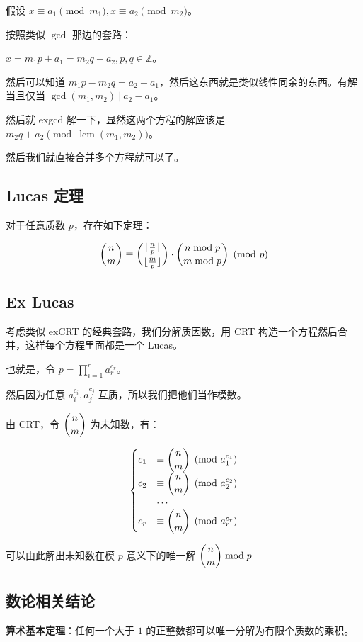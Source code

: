 \documentclass[titlepage, a4paper]{article}
\begin{document}
\begin{multicols}{2}
\begin{spacing}{0.6}
			 		假设 $x \equiv a_1 \pmod{m_1}, x \equiv a_2 \pmod{m_2}$。
			 		
			 		按照类似 $\gcd$ 那边的套路：
			 		
			 		$x = m_1p + a_1 = m_2q + a_2, p, q \in \mathbb{Z}$。
			 		
			 		然后可以知道 $m_1p - m_2q = a_2 - a_1$，然后这东西就是类似线性同余的东西。有解当且仅当 $\gcd(m_1, m_2)\ |\ a_2 - a_1$。
			 		
			 		然后就 exgcd 解一下，显然这两个方程的解应该是 $m_2q + a_2 \pmod{\operatorname{lcm}(m_1, m_2)}$。
			 		
			 		然后我们就直接合并多个方程就可以了。
			 	\subsection{Lucas 定理}
			 		对于任意质数 $p$，存在如下定理：
			 		
			 		$$
			 		\dbinom{n}{m} \equiv \dbinom{\lfloor\frac{n}{p}\rfloor}{\lfloor\frac{m}{p}\rfloor} \cdot \dbinom{n \bmod p}{m \bmod p} \pmod p
			 		$$
			 		
			 	\subsection{Ex Lucas}
			 		
			 		考虑类似 exCRT 的经典套路，我们分解质因数，用 CRT 构造一个方程然后合并，这样每个方程里面都是一个 Lucas。
			 		
			 		也就是，令 $p = \prod\limits_{i = 1}^ra_{r}^{c_r}$。
			 		
			 		然后因为任意 $a_{i}^{c_i}, a_{j}^{c_j}$ 互质，所以我们把他们当作模数。
			 		
			 		由 CRT，令 $\dbinom{n}{m}$ 为未知数，有：
			 		
			 		$$
			 		\begin{cases}
			 			c_1 &\equiv \dbinom{n}{m} \pmod {a_{1}^{c_1}} \\
			 			c_2 &\equiv \dbinom{n}{m} \pmod {a_{2}^{c_2}} \\
			 			&\cdots\\
			 			c_r &\equiv \dbinom{n}{m} \pmod {a_{r}^{c_r}}
			 		\end{cases}
			 		$$
			 		
			 		可以由此解出未知数在模 $p$ 意义下的唯一解 $\dbinom{n}{m} \bmod p$
			 	\subsection{数论相关结论}
			 		\textbf{算术基本定理}：任何一个大于 $1$ 的正整数都可以唯一分解为有限个质数的乘积。
			 	

\end{spacing}
\end{multicols}
\end{document}
